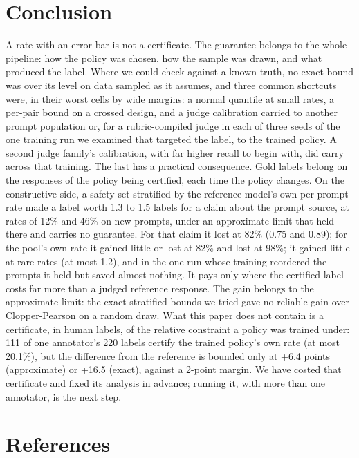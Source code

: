 \documentclass[11pt]{article}
\begin{document}
\section{Conclusion}

A rate with an error bar is not a certificate. The guarantee belongs to the whole pipeline: how the policy was chosen, how the sample was drawn, and what produced the label. Where we could check against a known truth, no exact bound was over its level on data sampled as it assumes, and three common shortcuts were, in their worst cells by wide margins: a normal quantile at small rates, a per-pair bound on a crossed design, and a judge calibration carried to another prompt population or, for a rubric-compiled judge in each of three seeds of the one training run we examined that targeted the label, to the trained policy. A second judge family's calibration, with far higher recall to begin with, did carry across that training. The last has a practical consequence. Gold labels belong on the responses of the policy being certified, each time the policy changes. On the constructive side, a safety set stratified by the reference model's own per-prompt rate made a label worth 1.3 to 1.5 labels for a claim about the prompt source, at rates of 12\% and 46\% on new prompts, under an approximate limit that held there and carries no guarantee. For that claim it lost at 82\% (0.75 and 0.89); for the pool's own rate it gained little or lost at 82\% and lost at 98\%; it gained little at rare rates (at most 1.2), and in the one run whose training reordered the prompts it held but saved almost nothing. It pays only where the certified label costs far more than a judged reference response. The gain belongs to the approximate limit: the exact stratified bounds we tried gave no reliable gain over Clopper-Pearson on a random draw. What this paper does not contain is a certificate, in human labels, of the relative constraint a policy was trained under: 111 of one annotator's 220 labels certify the trained policy's own rate (at most 20.1\%), but the difference from the reference is bounded only at +6.4 points (approximate) or +16.5 (exact), against a 2-point margin. We have costed that certificate and fixed its analysis in advance; running it, with more than one annotator, is the next step.


\section*{References}
\begingroup\small
\end{document}

